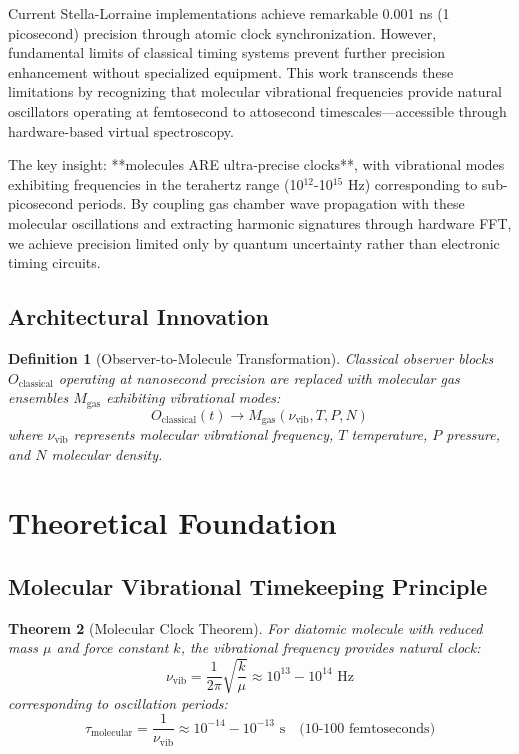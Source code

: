 \documentclass[12pt,a4paper]{article}
\newtheorem{theorem}{Theorem}[section]
\newtheorem{definition}[theorem]{Definition}
\begin{document}
Current Stella-Lorraine implementations achieve remarkable 0.001 ns (1 picosecond) precision through atomic clock synchronization. However, fundamental limits of classical timing systems prevent further precision enhancement without specialized equipment. This work transcends these limitations by recognizing that molecular vibrational frequencies provide natural oscillators operating at femtosecond to attosecond timescales—accessible through hardware-based virtual spectroscopy.

The key insight: **molecules ARE ultra-precise clocks**, with vibrational modes exhibiting frequencies in the terahertz range (10$^{12}$-10$^{15}$ Hz) corresponding to sub-picosecond periods. By coupling gas chamber wave propagation with these molecular oscillations and extracting harmonic signatures through hardware FFT, we achieve precision limited only by quantum uncertainty rather than electronic timing circuits.

\subsection{Architectural Innovation}

\begin{definition}[Observer-to-Molecule Transformation]
Classical observer blocks $O_{\text{classical}}$ operating at nanosecond precision are replaced with molecular gas ensembles $M_{\text{gas}}$ exhibiting vibrational modes:
\begin{equation}
O_{\text{classical}}(t) \rightarrow M_{\text{gas}}(\nu_{\text{vib}}, T, P, N)
\end{equation}
where $\nu_{\text{vib}}$ represents molecular vibrational frequency, $T$ temperature, $P$ pressure, and $N$ molecular density.
\end{definition}

\section{Theoretical Foundation}

\subsection{Molecular Vibrational Timekeeping Principle}

\begin{theorem}[Molecular Clock Theorem]
For diatomic molecule with reduced mass $\mu$ and force constant $k$, the vibrational frequency provides natural clock:
\begin{equation}
\nu_{\text{vib}} = \frac{1}{2\pi}\sqrt{\frac{k}{\mu}} \approx 10^{13} - 10^{14} \text{ Hz}
\end{equation}
corresponding to oscillation periods:
\begin{equation}
\tau_{\text{molecular}} = \frac{1}{\nu_{\text{vib}}} \approx 10^{-14} - 10^{-13} \text{ s} \quad \text{(10-100 femtoseconds)}
\end{equation}
\end{theorem}
\end{document}
